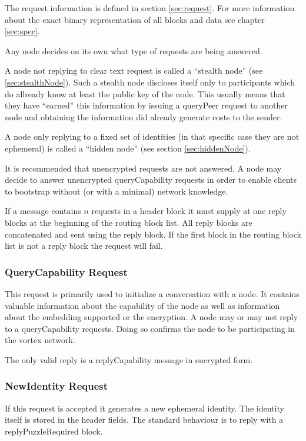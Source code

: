 The request information is defined in section \ref{sec:request}. For more information about the exact binary representation of all blocks and data see chapter \ref{sec:spec}.

Any node decides on its own what type of requests are being answered. 

A node not replying to clear text request is called a ``stealth node'' (see \ref{sec:stealthNode}). Such a stealth node discloses itself only to participants which do allready know at least the public key of the node. This usually means that they have ``earned'' this information by issuing a queryPeer request to another node and obtaining the information did already generate costs to the sender.

A node only replying to a fixed set of identities (in that specific case they are not ephemeral) is called a ``hidden node'' (see section \ref{sec:hiddenNode}).

It is recommended that unencrypted requests are not answered. A node may decide to answer unencrypted queryCapability requests in order to enable clients to bootstrap without (or with a minimal) network knowledge.

If a message contains $n$ requests in a header block it must supply at one reply blocks at the beginning of the routing block list. All reply blocks are concatenated and sent using the reply block. If the first block in the routing block list is not a reply block the request will fail.

\subsubsection{QueryCapability Request}
This request is primarily used to initialize a conversation with a node. It contains valuable information about the capability of the node as well as information about the embedding supported or the encryption. A node may or may not reply to a queryCapability requests. Doing so confirms the node to be participating in the vortex network.

The only valid reply is a replyCapability message in encrypted form.

\subsubsection{NewIdentity Request}
If this request is accepted it generates a new ephemeral identity. The identity itself is stored in the header fields. The standard behaviour is to reply with a replyPuzzleRequired block. 

